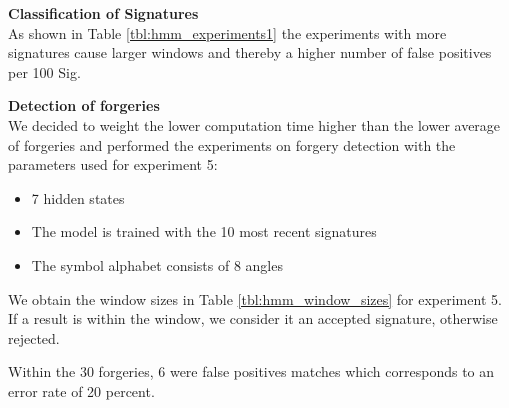 \documentclass[a4paper, oneside]{csthesis}
\begin{document}
\noindent\textbf{Classification of Signatures}\\
As shown in Table \ref{tbl:hmm_experiments1} the experiments with more signatures cause larger windows and thereby a higher number of false positives per 100 Sig.





\noindent\textbf{Detection of forgeries}\\
We decided to weight the lower computation time higher than the lower average of forgeries and performed the experiments on forgery detection with the parameters used for experiment 5:
\begin{itemize}
\item 7 hidden states
\item The model is trained with the 10 most recent signatures
\item The symbol alphabet consists of 8 angles
\end{itemize}

We obtain the window sizes in Table \ref{tbl:hmm_window_sizes} for experiment 5. If a result is within the window, we consider it an accepted signature, otherwise rejected.

Within the 30 forgeries, 6 were false positives matches which corresponds to an error rate of 20 percent.
\end{document}
